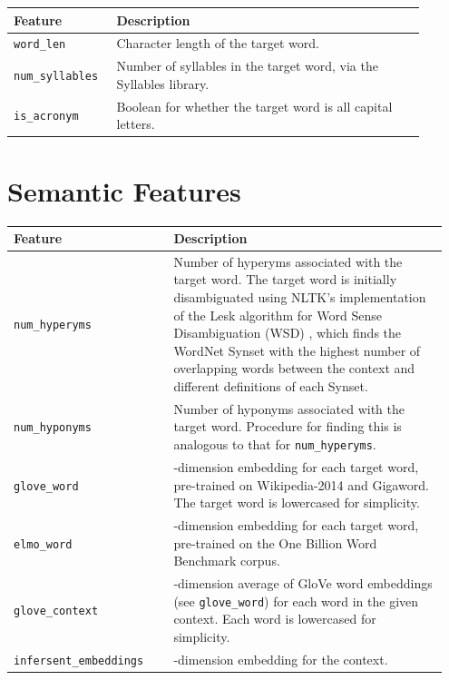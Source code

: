 \documentclass{dcthesis}
\theoremstyle{definition}
\theoremstyle{remark}
\begin{document}
\begin{table}[H]
  \centering
  \begin{tabular}{>{\centering\arraybackslash}p{0.2\linewidth}>{\arraybackslash}p{0.7\linewidth}}
    \textbf{Feature} & \textbf{Description} \\ \hline 
    \texttt{word\_len} & Character length of the target word.\\
    \hline 
    \texttt{num\_syllables} & Number of syllables in the target word, via the Syllables library.\\
    \hline 
    \texttt{is\_acronym} & Boolean for whether the target word is all capital letters.\\
  \end{tabular}
  \label{lexical_features}
\end{table}

\section{Semantic Features}

\begin{table}[H]
  \centering
  \begin{tabular}{>{\centering\arraybackslash}p{0.35\linewidth}>{\arraybackslash}p{0.6\linewidth}}
    \textbf{Feature} & \textbf{Description} \\ \hline  
    \texttt{num\_hyperyms} & Number of hyperyms associated with the target word. The target word is initially disambiguated using NLTK's implementation of the Lesk algorithm for Word Sense Disambiguation (WSD) \citep{lesk1986automatic}, which finds the WordNet Synset with the highest number of overlapping words between the context and different definitions of each Synset.\\
    \hline 
    \texttt{num\_hyponyms} & Number of hyponyms associated with the target word. Procedure for finding this is analogous to that for \texttt{num\_hyperyms}.\\
    \hline 
    \texttt{glove\_word} & 300-dimension embedding for each target word, pre-trained on Wikipedia-2014 and Gigaword. The target word is lowercased for simplicity.\\
    \hline 
    \texttt{elmo\_word} & 1024-dimension embedding for each target word, pre-trained on the One Billion Word Benchmark corpus.\\
    \hline 
    \texttt{glove\_context} & 300-dimension average of GloVe word embeddings (see \texttt{glove\_word}) for each word in the given context. Each word is lowercased for simplicity.\\
    \hline 
    \texttt{infersent\_embeddings} & 4096-dimension embedding for the context.\\
  \end{tabular}
  \label{semantic_features}
\end{table}
\end{document}
